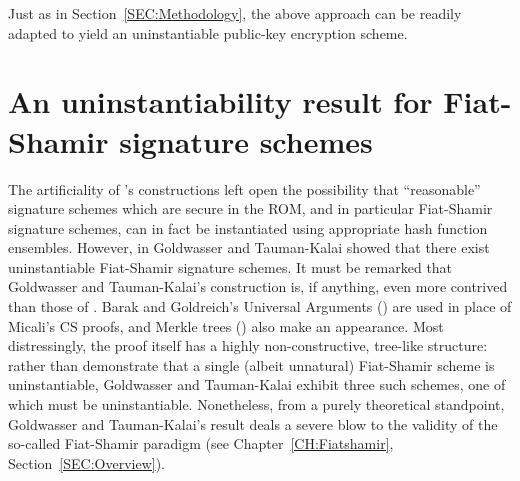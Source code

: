 Just as in Section~\ref{SEC:Methodology}, the above approach can be readily
adapted to yield an uninstantiable public-key encryption scheme.

\section{An uninstantiability result for Fiat-Shamir signature schemes}
\label{SEC:FiatShamir}
The artificiality of \cite{canetti:romfails}'s constructions left open the
possibility that ``reasonable'' signature schemes which are secure in the ROM,
and in particular Fiat-Shamir signature schemes, can in fact be instantiated
using appropriate hash function ensembles. 
However, in \cite{goldwasser:fsparadigmfails} Goldwasser and Tauman-Kalai
showed that there exist uninstantiable Fiat-Shamir signature schemes. It must
be remarked that Goldwasser and Tauman-Kalai's construction is, if anything,
even more contrived than those of \cite{canetti:romfails}. Barak and
Goldreich's Universal Arguments (\cite{barak:universalarguments}) are used in
place of Micali's CS proofs, and Merkle trees (\cite{merkle:tree}) also make
an appearance. Most distressingly, the proof itself has a highly
non-constructive, tree-like structure: rather than demonstrate that a single
(albeit unnatural) Fiat-Shamir scheme is uninstantiable, Goldwasser and
Tauman-Kalai exhibit three such schemes, one of which must be uninstantiable.
Nonetheless, from a purely theoretical standpoint, Goldwasser and
Tauman-Kalai's result deals a severe blow to the validity of the so-called
Fiat-Shamir paradigm (see Chapter~\ref{CH:Fiatshamir},
Section~\ref{SEC:Overview}).

